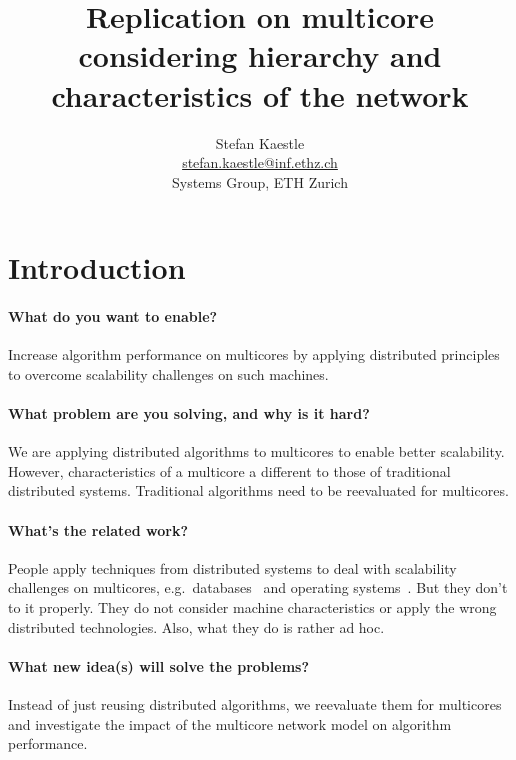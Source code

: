 \documentclass{article}
\begin{document}
\title{Replication on multicore considering hierarchy and
  characteristics of the network}

\newcommand{\eaddr}{stefan.kaestle@inf.ethz.ch}
\newcommand{\email}{\href{mailto:\eaddr}{\eaddr}}

\author{Stefan Kaestle\\
  \email \\
  Systems Group, ETH Zurich}

\maketitle

\section{Introduction}

\paragraph{What do you want to enable?} Increase algorithm performance
on multicores by applying distributed principles to overcome
scalability challenges on such machines. 

\paragraph{What problem are you solving, and why is it hard?} We are
applying distributed algorithms to multicores to enable better
scalability. However, characteristics of a multicore a different to
those of traditional distributed systems. Traditional algorithms need
to be reevaluated for multicores.

\paragraph{What's the related work?} People apply techniques from
distributed systems to deal with scalability challenges on multicores,
e.g.\ databases~\cite{Salomie2011, Wiesmann2000} and operating
systems~\cite{fos:osr09, tornado:osdi99, barrelfish:sosp09}. But they
don't to it properly. They do not consider machine characteristics or
apply the wrong distributed technologies. Also, what they do is rather
ad hoc. 

\paragraph{What new idea(s) will solve the problems?} Instead of just
reusing distributed algorithms, we reevaluate them for multicores and
investigate the impact of the multicore network model on algorithm
performance.
\end{document}
